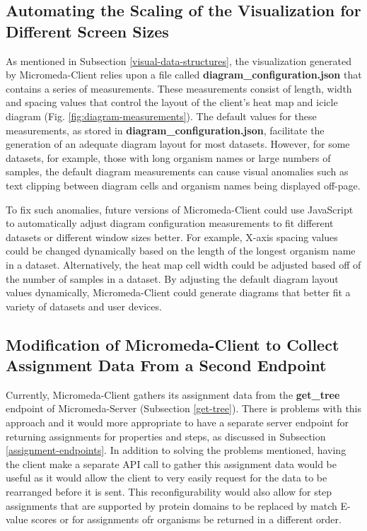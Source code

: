 \subsection{Automating the Scaling of the Visualization for Different Screen Sizes}

As mentioned in Subsection \ref{visual-data-structures}, the visualization generated by Micromeda-Client relies upon a file called \textbf{diagram\_configuration.json} that contains a series of measurements. These measurements consist of length, width and spacing values that control the layout of the client's heat map and icicle diagram (Fig. \ref{fig:diagram-measurements}). The default values for these measurements, as stored in \textbf{diagram\_configuration.json}, facilitate the generation of an adequate diagram layout for most datasets. However, for some datasets, for example, those with long organism names or large numbers of samples, the default diagram measurements can cause visual anomalies such as text clipping between diagram cells and organism names being displayed off-page.

To fix such anomalies, future versions of Micromeda-Client could use JavaScript to automatically adjust diagram configuration measurements to fit different datasets or different window sizes better. For example, X-axis spacing values could be changed dynamically based on the length of the longest organism name in a dataset. Alternatively, the heat map cell width could be adjusted based off of the number of samples in a dataset. By adjusting the default diagram layout values dynamically, Micromeda-Client could generate diagrams that better fit a variety of datasets and user devices.

\subsection{Modification of Micromeda-Client to Collect Assignment Data From a Second Endpoint}

Currently, Micromeda-Client gathers its assignment data from the \textbf{get\_tree} endpoint of Micromeda-Server (Subsection \ref{get-tree}). There is problems with this approach and it would more appropriate to have a separate server endpoint for returning assignments for properties and steps, as discussed in Subsection \ref{assignment-endpoints}. In addition to solving the problems mentioned, having the client make a separate API call to gather this assignment data would be useful as it would allow the client to very easily request for the data to be rearranged before it is sent. This reconfigurability would also allow for step assignments that are supported by protein domains to be replaced by match E-value scores or for assignments ofr organisms be returned in a different order. 

